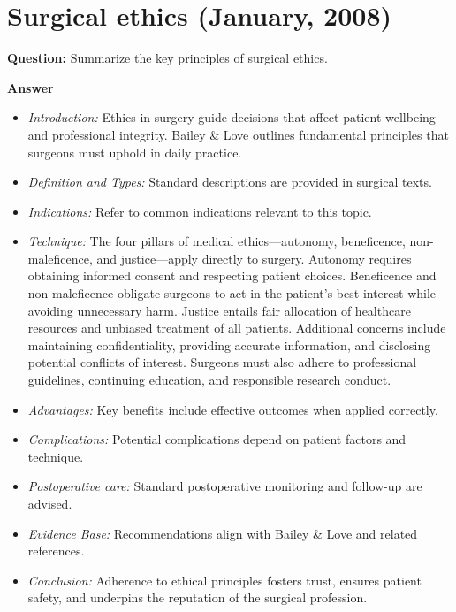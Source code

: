 \documentclass{article}
\begin{document}
\section{Surgical ethics (January, 2008)}

\textbf{Question:} Summarize the key principles of surgical ethics.

\textbf{Answer}
\begin{itemize}

\item \emph{Introduction:} Ethics in surgery guide decisions that affect patient wellbeing and professional integrity. Bailey \& Love outlines fundamental principles that surgeons must uphold in daily practice.
\item \emph{Definition and Types:} Standard descriptions are provided in surgical texts.
\item \emph{Indications:} Refer to common indications relevant to this topic.

\item \emph{Technique:} The four pillars of medical ethics—autonomy, beneficence, non-maleficence, and justice—apply directly to surgery. Autonomy requires obtaining informed consent and respecting patient choices. Beneficence and non-maleficence obligate surgeons to act in the patient's best interest while avoiding unnecessary harm. Justice entails fair allocation of healthcare resources and unbiased treatment of all patients. Additional concerns include maintaining confidentiality, providing accurate information, and disclosing potential conflicts of interest. Surgeons must also adhere to professional guidelines, continuing education, and responsible research conduct.
\item \emph{Advantages:} Key benefits include effective outcomes when applied correctly.
\item \emph{Complications:} Potential complications depend on patient factors and technique.
\item \emph{Postoperative care:} Standard postoperative monitoring and follow-up are advised.
\item \emph{Evidence Base:} Recommendations align with Bailey \& Love and related references.

\item \emph{Conclusion:} Adherence to ethical principles fosters trust, ensures patient safety, and underpins the reputation of the surgical profession.


\end{itemize}
\end{document}
